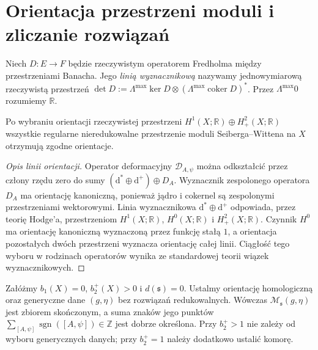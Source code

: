 \section{Orientacja przestrzeni moduli i zliczanie rozwiązań}
\label{sec:tg-sw12-orientation}

\begin{definicja}
Niech $D:E\to F$ będzie rzeczywistym operatorem Fredholma
między przestrzeniami Banacha. Jego \emph{linią wyznacznikową}
nazywamy jednowymiarową rzeczywistą przestrzeń
$\det D:=\Lambda^{\max}\ker D\otimes
(\Lambda^{\max}\operatorname{coker}D)^*$.
Przez $\Lambda^{\max}0$ rozumiemy $\mathbb R$.
\end{definicja}

\begin{stwierdzenie}
\label{prop:tg-sw12-hom-orient}
Po wybraniu orientacji rzeczywistej przestrzeni
$H^1(X;\mathbb R)\oplus H^2_+(X;\mathbb R)$
wszystkie regularne nieredukowalne przestrzenie moduli
Seiberga--Wittena na $X$ otrzymują zgodne orientacje.
\end{stwierdzenie}

\begin{proof}[Opis linii orientacji]
Operator deformacyjny $\mathcal D_{A,\psi}$ można odkształcić
przez człony rzędu zero do sumy
$(\mathrm d^*\oplus\mathrm d^+)\oplus D_A$.
Wyznacznik zespolonego operatora $D_A$ ma orientację
kanoniczną, ponieważ jądro i cokernel są zespolonymi
przestrzeniami wektorowymi. Linia wyznacznikowa
$\mathrm d^*\oplus\mathrm d^+$ odpowiada, przez teorię
Hodge'a, przestrzeniom
$H^1(X;\mathbb R)$, $H^0(X;\mathbb R)$ i $H^2_+(X;\mathbb R)$.
Czynnik $H^0$ ma orientację kanoniczną wyznaczoną przez
funkcję stałą $1$, a orientacja pozostałych dwóch
przestrzeni wyznacza orientację całej linii.
Ciągłość tego wyboru w rodzinach operatorów wynika
ze standardowej teorii wiązek wyznacznikowych.
\end{proof}

\begin{stwierdzenie}
\label{prop:tg-sw12-count}
Załóżmy $b_1(X)=0$, $b_2^+(X)>0$ i $d(\mathfrak s)=0$.
Ustalmy orientację homologiczną oraz generyczne dane
$(g,\eta)$ bez rozwiązań redukowalnych. Wówczas
$\mathcal M_{\mathfrak s}(g,\eta)$ jest zbiorem skończonym,
a suma znaków jego punktów
$\sum_{[A,\psi]}\operatorname{sgn}([A,\psi])\in\mathbb Z$
jest dobrze określona. Przy $b_2^+>1$ nie zależy
od wyboru generycznych danych; przy $b_2^+=1$
należy dodatkowo ustalić komorę.
\end{stwierdzenie}

